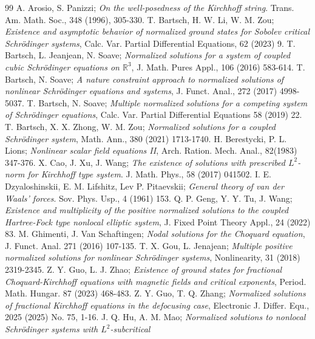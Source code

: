 \documentclass[10pt,a4paper]{amsart}
\numberwithin{equation}{section}
\begin{document}
\begin{thebibliography}{99}
 A. Arosio, S. Panizzi;
\emph{On the well-posedness of the Kirchhoff string}. 
Trans. Am. Math. Soc., 348 (1996), 305-330.
 T. Bartsch, H. W. Li, W. M. Zou;
\emph{Existence and asymptotic behavior of normalized ground states for Sobolev
critical Schr\"{o}dinger systems}, Calc. Var. Partial Differential Equations, 62 (2023) 9.
 T. Bartsch, L. Jeanjean, N. Soave;
\emph{Normalized solutions for a system of coupled cubic Schr\"{o}dinger equations
on $\mathbb{R}^3$}, J. Math. Pures Appl., 106 (2016) 583-614.
 T. Bartsch, N. Soave;
\emph{A nature constraint approach to normalized solutions of nonlinear 
Schr\"{o}dinger equations and systems}, J. Funct. Anal., 272 (2017) 4998-5037.
 T. Bartsch, N. Soave;
\emph{Multiple normalized solutions for a competing system of Schr\"{o}dinger equations},
 Calc. Var. Partial Differential Equations 58 (2019) 22.
 T. Bartsch, X. X. Zhong, W. M. Zou;
\emph{Normalized solutions for a coupled Schr\"{o}dinger system}, Math. Ann.,
380 (2021) 1713-1740.
 H. Berestycki, P. L. Lions;
\emph{Nonlinear scalar field equations II},
 Arch. Ration. Mech. Anal., 82(1983) 347-376.
 X. Cao, J. Xu, J. Wang;
\emph{The existence of solutions with prescribed $L^2$-norm for Kirchhoff type system}. 
J. Math. Phys., 58 (2017) 041502.
 I. E. Dzyaloshinskii, E. M. Lifshitz, Lev P. Pitaevskii;
\emph{General theory of van der Waals' forces}. Sov. Phys. Usp., 4 (1961) 153.
 Q. P. Geng, Y. Y. Tu, J. Wang;
\emph{Existence and multiplicity of the positive normalized solutions to the
coupled Hartree-Fock type nonlocal elliptic system}, 
J. Fixed Point Theory Appl., 24 (2022) 83.
 M. Ghimenti, J. Van Schaftingen;
\emph{Nodal solutions for the Choquard equation}, J. Funct. Anal. 271
(2016) 107-135.
 T. X. Gou, L. Jenajean;
\emph{Multiple positive normalized solutions for nonlinear Schr\"{o}dinger systems},
Nonlinearity, 31 (2018) 2319-2345.
 Z. Y. Guo, L. J. Zhao;
\emph{Existence of ground states for fractional Choquard-Kirchhoff
equations with magnetic fields and critical exponents}, 
Period. Math. Hungar. 87 (2023) 468-483.
 Z. Y. Guo, T. Q. Zhang;
\emph{Normalized solutions of fractional Kirchhoff equations in the
defocusing case}, Electronic J. Differ. Equ., 2025 (2025) No. 75, 1-16.
 J. Q. Hu, A. M. Mao;
\emph{Normalized solutions to nonlocal Schr\"{o}dinger systems with $L^2$-subcritical
}
\end{thebibliography}
\end{document}
